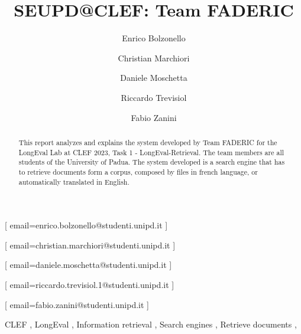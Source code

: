 \documentclass{ceurart}
\begin{document}


\title{SEUPD@CLEF: Team FADERIC}

\author[1]{Enrico Bolzonello}[%
email=enrico.bolzonello@studenti.unipd.it
]

\author[1]{Christian Marchiori}[%
email=christian.marchiori@studenti.unipd.it
]

\author[1]{Daniele Moschetta}[%
email=daniele.moschetta@studenti.unipd.it
]

\author[1]{Riccardo Trevisiol}[%
email=riccardo.trevisiol.1@studenti.unipd.it
]

\author[1]{Fabio Zanini}[%
email=fabio.zanini@studenti.unipd.it
]

\address[1]{University of Padua, Italy}


\begin{abstract}
This report analyzes and explains the system developed by Team FADERIC for the LongEval Lab at CLEF 2023, Task 1 - LongEval-Retrieval. 
The team members are all students of the University of Padua.
The system developed is a search engine that has to retrieve documents form a corpus, composed by files in french language, or automatically translated in English.
\end{abstract}

\begin{keywords}
	CLEF \sep
	LongEval \sep
	Information retrieval \sep
	Search engines \sep
	Retrieve documents \sep
\end{keywords}

\maketitle



\newpage





\newpage


\newpage



\end{document}
